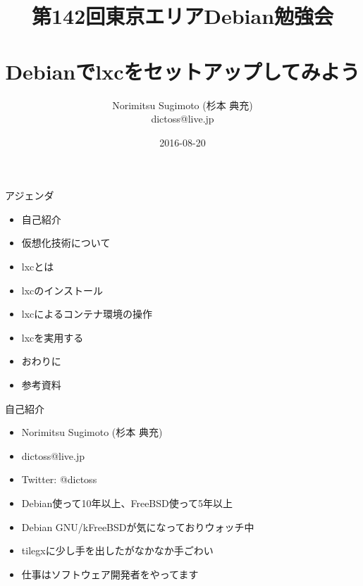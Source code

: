\title{第142回東京エリアDebian勉強会 \\　\\Debianでlxcをセットアップしてみよう}
\subtitle{}
\author{Norimitsu Sugimoto (杉本 典充) \\dictoss@live.jp}
\date{2016-08-20}



\frame{\titlepage{}}


\begin{frame}{アジェンダ}
  \begin{itemize}
  \item 自己紹介
  \item 仮想化技術について
  \item lxcとは
  \item lxcのインストール
  \item lxcによるコンテナ環境の操作
  \item lxcを実用する
  \item おわりに
  \item 参考資料
  \end{itemize}
\end{frame}


\begin{frame}{自己紹介}
  \begin{itemize}
  \item Norimitsu Sugimoto (杉本 典充)
  \item dictoss@live.jp
  \item Twitter: @dictoss
  \item Debian使って10年以上、FreeBSD使って5年以上
  \item Debian GNU/kFreeBSDが気になっておりウォッチ中
  \item tilegxに少し手を出したがなかなか手ごわい
  \item 仕事はソフトウェア開発者をやってます
  \end{itemize}
\end{frame}


